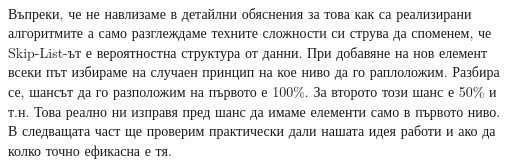 \documentclass[a4paper,12pt,fleqn]{article}
\begin{document}
	\\Въпреки, че не навлизаме в детайлни обяснения за това как са реализирани алгоритмите а само разглеждаме техните сложности си струва да споменем, че Skip-List-ът е вероятностна структура от данни. При добавяне на нов елемент всеки път избираме на случаен принцип на кое ниво да го раплоложим. Разбира се, шансът да го разположим на първото е 100\%. За второто този шанс е 50\% и т.н. Това реално ни изправя пред шанс да имаме елементи само в първото ниво. В следващата част ще проверим практически дали нашата идея работи и ако да колко точно ефикасна е тя.
	
\end{document}
